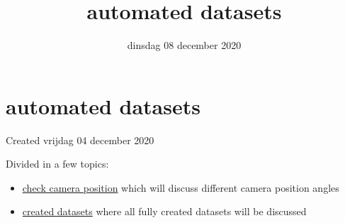 \documentclass{scrartcl}
\title{automated datasets}
\date{dinsdag 08 december 2020}
\author{}
\begin{document}
\maketitle

		\section{automated datasets}

Created vrijdag 04 december 2020



Divided in a few topics:



\begin{itemize}
\item \href{./automated_datasets/1_check_camera_position.tex}{check camera position} which will discuss different camera position angles
\item \href{./automated_datasets/2_created_datasets.tex}{created datasets} where all fully created datasets will be discussed
\end{itemize}
\end{document}

